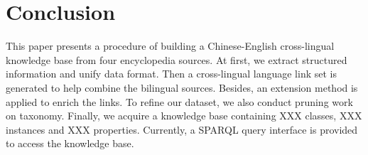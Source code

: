 \documentclass[runningheads,a4paper]{llncs}
\begin{document}

\section{Conclusion}
\label{sec:con}

This paper presents a procedure of building a Chinese-English cross-lingual knowledge base from four encyclopedia sources. At first, we extract structured information and unify data format. Then a cross-lingual language link set is generated to help combine the bilingual sources. Besides, an extension method is applied to enrich the links. To refine our dataset, we also conduct pruning work on taxonomy. Finally, we acquire a knowledge base containing XXX classes, XXX instances and XXX properties. Currently, a SPARQL query interface is provided to access the knowledge base.





\end{document}
